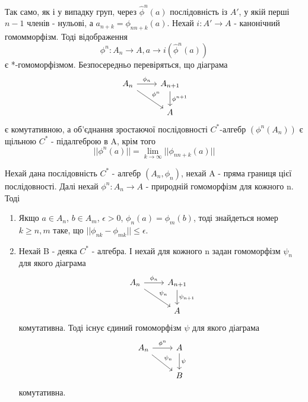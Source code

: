 Так само, як і у випадку груп, через $\hat{\phi}^n(a)$ послідовність із $A'$,
у якій перші $n-1$ членів - нульові, а $a_{n+k} = \phi_{n n+k}(a)$.
Нехай $i: A' \rightarrow A$ - канонічний гомомморфізм.
Тоді відображення
\begin{equation*}
    \phi^n: A_n \to A, a \to i(\hat{\phi}^n(a))
\end{equation*}
є *-гомоморфізмом.
Безпосередньо перевіряться, що діаграма
\begin{equation*}
    \begin{tikzcd}
        A_n \arrow[rd, "\phi^n"] \arrow[r, "\phi_n"] & A_{n+1} \arrow[d, "\phi^{n+1}"] \\
        & A
    \end{tikzcd}
\end{equation*}
є комутативною, а об'єднання зростаючої послідовності $C^*$-алгебр $(\phi^n(A_n))$ є щільною $C^*$ - підалгеброю
в A, крім того
\begin{equation*}
    ||\phi^n(a)|| = \lim_{k \to \infty} ||\phi_{n n+k}(a)||
\end{equation*}

\begin{theorem}
    Нехай дана послідовність $C^*$ - алгебр $(A_n, \phi_n)$, нехай A - пряма границя цієї послідовності.
    Далі нехай $\phi^n: A_n \to A$ - природній гомоморфізм для кожного n.
    Тоді
    \begin{enumerate}
        \item Якщо $a \in A_n$, $b \in A_m$, $\epsilon > 0$, $\phi_n(a) = \phi_m(b)$, тоді знайдеться номер $k \geq n,m$
        таке, що $||\phi_{nk} - \phi_{mk}|| \leq \epsilon$.
        \item Нехай B - деяка $C^*$ - алгебра.
        І нехай для кожного n задан гомоморфізм $\psi_n$ для якого діаграма
        \begin{equation*}
            \begin{tikzcd}
                A_n \arrow[rd, "\psi_n"] \arrow[r, "\phi_n"] & A_{n+1} \arrow[d, "\psi_{n+1}"] \\
                & A
            \end{tikzcd}
        \end{equation*}
        комутативна.
        Тоді існує єдиний гомоморфізм $\psi$ для якого діаграма
        \begin{equation*}
            \begin{tikzcd}
                A_n \arrow[rd, "\psi_n"] \arrow[r, "\phi^n"] & A \arrow[d, "\psi"] \\
                & B
            \end{tikzcd}
        \end{equation*}
        комутативна.
    \end{enumerate}
\end{theorem}


